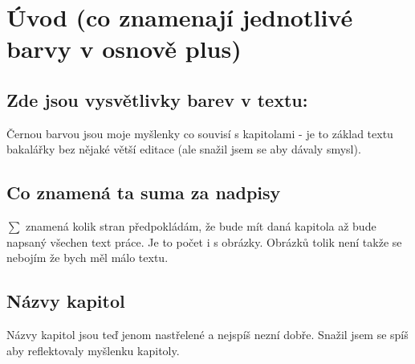 \chapter*{Úvod (co znamenají jednotlivé barvy v osnově plus)}\label{chap:uvod}

\section*{Zde jsou vysvětlivky barev v textu:}




Černou barvou jsou moje myšlenky co souvisí s kapitolami - je to základ textu bakalářky bez nějaké větší editace (ale snažil jsem se aby dávaly smysl).

\section*{Co znamená ta suma za nadpisy}
$\sum$ znamená kolik stran předpokládám, že bude mít daná kapitola až bude napsaný všechen text práce. Je to počet i s obrázky. Obrázků tolik není takže se nebojím že bych měl málo textu.

\section*{Názvy kapitol}
Názvy kapitol jsou teď jenom nastřelené a nejspíš nezní dobře. Snažil jsem se spíš aby reflektovaly myšlenku kapitoly.